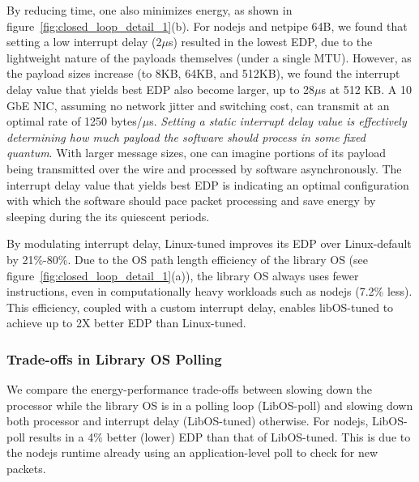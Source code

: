 By reducing time, one also minimizes energy, as shown in figure~\ref{fig:closed_loop_detail_1}(b). For nodejs and netpipe 64B, we found that setting a low interrupt delay (2$\mu$s) resulted in the lowest EDP, due to the lightweight nature of the payloads themselves (under a single MTU). However, as the payload sizes increase (to 8KB, 64KB, and 512KB), we found the interrupt delay value that yields best EDP also become larger, up to 28$\mu$s at 512 KB. A 10 GbE NIC, assuming no network jitter and switching cost, can transmit at an optimal rate of 1250 bytes/$\mu$s.
\textit{Setting a static interrupt delay value is effectively determining how much payload the software should process in some fixed quantum}. With larger message sizes, one can imagine portions of its payload being transmitted over the wire and processed by software asynchronously. The interrupt delay value that yields best EDP is indicating an optimal configuration with which the software should pace packet processing and save energy by sleeping during the its quiescent periods.

By modulating interrupt delay, Linux-tuned improves its EDP over Linux-default by 21\%-80\%. Due to the OS path length efficiency of the library OS (see figure~\ref{fig:closed_loop_detail_1}(a)), the library OS always uses fewer instructions, even in computationally heavy workloads such as nodejs (7.2\% less).
This efficiency, coupled with a custom interrupt delay, enables libOS-tuned to achieve up to 2X better EDP than Linux-tuned.


\subsubsection{Trade-offs in Library OS Polling}
\label{sec:closed_loop:poll}
We compare the energy-performance trade-offs between slowing down the processor while the library OS is in a polling loop (LibOS-poll) and slowing down both processor and interrupt delay (LibOS-tuned) otherwise.
For nodejs, LibOS-poll results in a 4\% better (lower) EDP than that of LibOS-tuned. This is due to the nodejs runtime already using an application-level poll to check for new packets.

